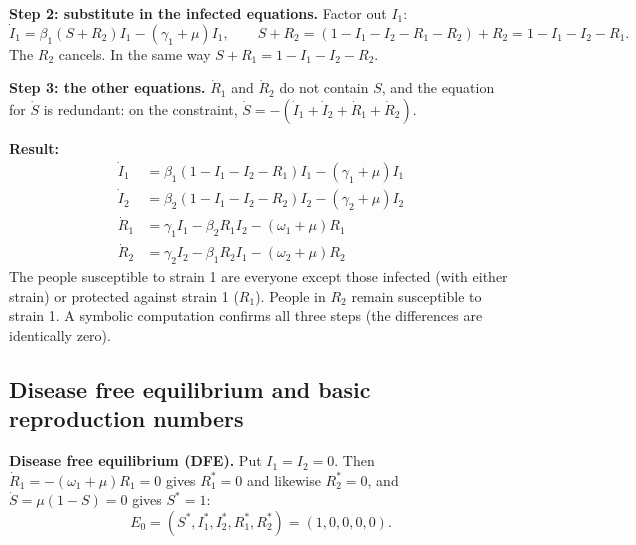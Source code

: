 \documentclass[11pt,a4paper]{article}
\begin{document}
\textbf{Step 2: substitute in the infected equations.} Factor out $I_1$:
\[
\dot I_1=\beta_1(S+R_2)I_1-(\gamma_1+\mu)I_1,\qquad
S+R_2=(1-I_1-I_2-R_1-R_2)+R_2=1-I_1-I_2-R_1 .
\]
The $R_2$ cancels. In the same way $S+R_1=1-I_1-I_2-R_2$.

\textbf{Step 3: the other equations.} $\dot R_1$ and $\dot R_2$ do not contain $S$, and the equation for $\dot S$ is redundant: on the constraint, $\dot S=-(\dot I_1+\dot I_2+\dot R_1+\dot R_2)$.

\textbf{Result:}
\[
\boxed{\begin{aligned}
\dot I_1&=\beta_1(1-I_1-I_2-R_1)I_1-(\gamma_1+\mu)I_1\\
\dot I_2&=\beta_2(1-I_1-I_2-R_2)I_2-(\gamma_2+\mu)I_2\\
\dot R_1&=\gamma_1I_1-\beta_2R_1I_2-(\omega_1+\mu)R_1\\
\dot R_2&=\gamma_2I_2-\beta_1R_2I_1-(\omega_2+\mu)R_2
\end{aligned}}
\]
The people susceptible to strain 1 are everyone except those infected (with either strain) or protected against strain 1 ($R_1$). People in $R_2$ remain susceptible to strain 1. A symbolic computation confirms all three steps (the differences are identically zero).

\subsection{Disease free equilibrium and basic reproduction numbers}

\textbf{Disease free equilibrium (DFE).} Put $I_1=I_2=0$. Then $\dot R_1=-(\omega_1+\mu)R_1=0$ gives $R_1^*=0$ and likewise $R_2^*=0$, and $\dot S=\mu(1-S)=0$ gives $S^*=1$:
\[
E_0=(S^*,I_1^*,I_2^*,R_1^*,R_2^*)=(1,0,0,0,0).
\]
\end{document}
